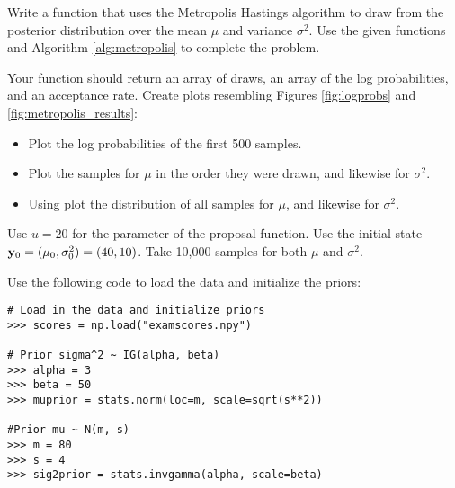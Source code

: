 \begin{comment}
\begin{figure}[h]
\centering
\texttt{[image: figures/logprobs.pdf]}
\caption{Log probabilities of our samples.}
\end{figure}

From this we can see that after between $300$ and $500$ iterations, we had converged to the correct distribution. We can visualize the path of our sampler by plotting the samples themselves:
\begin{figure}[h]
\centering
\texttt{[image: figures/samples.pdf]}
\caption{Samples from the Metropolis algorithm.}
\end{figure}

\begin{problem}
Using $\mu$ and $\Sigma$ as defined previously and using an initial state $\mathbf{x} = \left[ \begin{array}{cc} 1000 & -1000 \end{array} \right]$ run your Metropolis sampler for $10000$ iterations. Plot the log probs as well as the samples. How long did it take to converge?
\end{problem}
\end{comment}

\begin{problem}
Write a function that uses the Metropolis Hastings algorithm to draw from the posterior distribution over the mean $\mu$ and variance $\sigma^2$. Use the given functions and Algorithm \ref{alg:metropolis} to complete the problem.

Your function should return an array of draws, an array of the log probabilities, and an acceptance rate.
Create plots resembling Figures \ref{fig:logprobs} and \ref{fig:metropolis_results}:
\begin{itemize}
\item Plot the log probabilities of the first 500 samples.
\item Plot the samples for $\mu$ in the order they were drawn, and likewise for $\sigma^2$.
\item Using  plot the distribution of all samples for $\mu$, and likewise for $\sigma^2$.
\end{itemize}

Use $u=20$ for the parameter of the proposal function.
Use the initial state $\mathbf{y}_0=(\mu_0,\sigma^2_0)=(40,10)$.
Take 10,000 samples for both $\mu$ and $\sigma^2$.

Use the following code to load the data and initialize the priors:
\begin{lstlisting}
# Load in the data and initialize priors
>>> scores = np.load("examscores.npy")

# Prior sigma^2 ~ IG(alpha, beta)
>>> alpha = 3
>>> beta = 50
>>> muprior = stats.norm(loc=m, scale=sqrt(s**2))

#Prior mu ~ N(m, s)
>>> m = 80
>>> s = 4
>>> sig2prior = stats.invgamma(alpha, scale=beta)
\end{lstlisting}

\end{problem}

